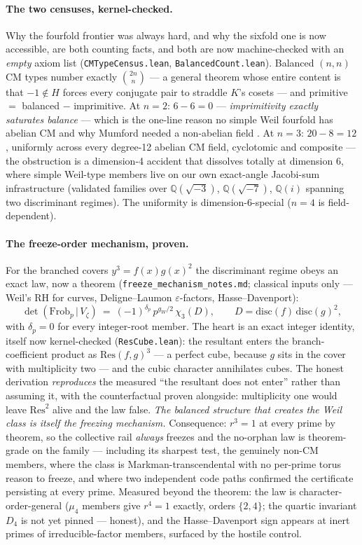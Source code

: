 \documentclass[11pt]{article}
\theoremstyle{definition}
\theoremstyle{remark}
\begin{document}
\paragraph{The two censuses, kernel-checked.} Why the fourfold frontier
was always hard, and why the sixfold one is now accessible, are both
counting facts, and both are now machine-checked with an \emph{empty}
axiom list (\texttt{CMTypeCensus.lean}, \texttt{BalancedCount.lean}).
Balanced $(n,n)$ CM types number exactly $\binom{2n}{n}$ --- a general
theorem whose entire content is that $-1\notin H$ forces every conjugate
pair to straddle $K$'s cosets --- and primitive $=$ balanced $-$
imprimitive. At $n=2$: $6-6=0$ --- \emph{imprimitivity exactly saturates
balance} --- which is the one-line reason no simple Weil fourfold has
abelian CM and why Mumford needed a non-abelian field \cite{Mumford69}. At
$n=3$: $20-8=12$, uniformly across every degree-12 abelian CM field,
cyclotomic and composite --- the obstruction is a dimension-4 accident that
dissolves totally at dimension 6, where simple Weil-type members live on
our own exact-angle Jacobi-sum infrastructure (validated families over
$\mathbb Q(\sqrt{-3})$, $\mathbb Q(\sqrt{-7})$, $\mathbb Q(i)$ spanning two
discriminant regimes). The uniformity is dimension-6-special ($n=4$ is
field-dependent).

\paragraph{The freeze-order mechanism, proven.} For the branched covers
$y^3=f(x)g(x)^2$ the discriminant regime obeys an exact law, now a theorem
(\texttt{freeze\_mechanism\_notes.md}; classical inputs only --- Weil's RH
for curves, Deligne--Laumon $\varepsilon$-factors, Hasse--Davenport):
\[
  \det(\mathrm{Frob}_p\,|\,V_\zeta)\ =\ (-1)^{\delta_p}\,p^{g_W/2}\,
  \chi_3(D),\qquad D=\mathrm{disc}(f)\,\mathrm{disc}(g)^2,
\]
with $\delta_p=0$ for every integer-root member. The heart is an exact
integer identity, itself now kernel-checked
(\texttt{ResCube.lean}): the resultant enters the branch-coefficient
product as $\mathrm{Res}(f,g)^{3}$ --- a perfect cube, because $g$ sits in
the cover with multiplicity two --- and the cubic character annihilates
cubes. The honest derivation \emph{reproduces} the measured ``the resultant
does not enter'' rather than assuming it, with the counterfactual proven
alongside: multiplicity one would leave $\mathrm{Res}^2$ alive and the law
false. \emph{The balanced structure that creates the Weil class is itself
the freezing mechanism.} Consequence: $r^3=1$ at every prime by theorem, so
the collective rail \emph{always} freezes and the no-orphan law is
theorem-grade on the family --- including its sharpest test, the
genuinely non-CM members, where the class is Markman-transcendental with no
per-prime torus reason to freeze, and where two independent code paths
confirmed the certificate persisting at every prime. Measured beyond the
theorem: the law is character-order-general ($\mu_4$ members give $r^4=1$
exactly, orders $\{2,4\}$; the quartic invariant $D_4$ is not yet pinned
--- honest), and the Hasse--Davenport sign appears at inert primes of
irreducible-factor members, surfaced by the hostile control.
\end{document}
